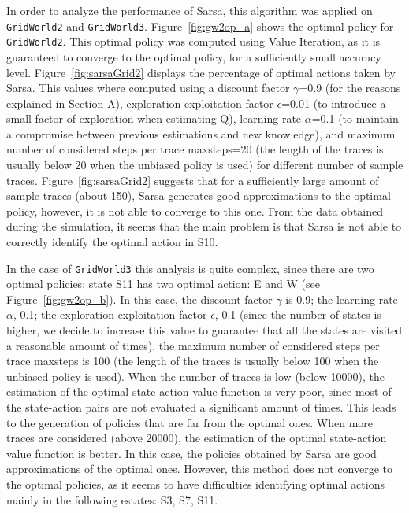 \documentclass[10pt]{article}   	%
\begin{document}
In order to analyze the performance of Sarsa, this algorithm was applied on \texttt{GridWorld2} and \texttt{GridWorld3}. Figure~\ref{fig:gw2op_a} shows the optimal policy for \texttt{GridWorld2}. This optimal policy was computed using Value Iteration, as it is guaranteed to converge to the optimal policy, for a sufficiently small accuracy level. Figure~\ref{fig:sarsaGrid2} displays the percentage of optimal actions taken by Sarsa. This values where computed using a discount factor $\gamma$=0.9 (for the reasons explained in Section A), exploration-exploitation factor $\epsilon$=0.01 (to introduce a small factor of exploration when estimating Q), learning rate $\alpha$=0.1 (to maintain a compromise between previous estimations and new knowledge), and maximum number of considered steps per trace maxsteps=20 (the length of the traces is usually below 20 when the unbiased policy is used) for different number of sample traces. Figure~\ref{fig:sarsaGrid2} suggests that for a sufficiently large amount of sample traces (about 150), Sarsa generates good approximations to the optimal policy, however, it is not able to converge to this one. From the data obtained during the simulation, it seems that the main problem is that Sarsa is not able to correctly identify the optimal action in S10.

In the case of \texttt{GridWorld3} this analysis is quite complex, since there are two optimal policies; state S11 has two optimal action: E and W (see Figure~\ref{fig:gw2op_b}). In this case, the discount factor $\gamma$ is 0.9; the learning rate $\alpha$, 0.1; the exploration-exploitation factor $\epsilon$, 0.1 (since the number of states is higher, we decide to increase this value to guarantee that all the states are visited a reasonable amount of times), the maximum number of considered steps per trace maxsteps is 100 (the length of the traces is usually below 100 when the unbiased policy is used). When the number of traces is low (below 10000), the estimation of the optimal state-action value function is very poor, since most of the state-action pairs are not evaluated a significant amount of times. This leads to the generation of policies that are far from the optimal ones. When more traces are considered (above 20000), the estimation of the optimal state-action value function is better. In this case, the policies obtained by Sarsa are good approximations of the optimal ones. However, this method does not converge to the optimal policies, as it seems to have difficulties identifying optimal actions mainly in the following estates: S3, S7, S11. 
\end{document}
